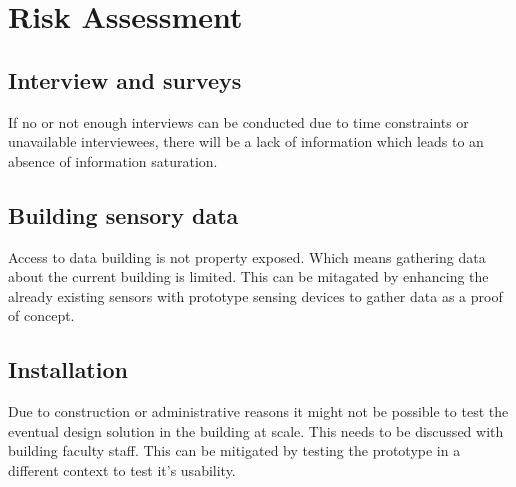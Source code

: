 \section{Risk Assessment}

\subsection{Interview and surveys}

If no or not enough interviews can be conducted due to time constraints or unavailable interviewees, there will be a lack of information which leads to an absence of information saturation. 

\subsection{Building sensory data}

Access to data building is not property exposed. Which means gathering data about the current building is limited. This can be mitagated by enhancing the already existing sensors with prototype sensing devices to gather data as a proof of concept.

\subsection{Installation}

Due to construction or administrative reasons it might not be possible to test the eventual design solution in the building at scale. This needs to be discussed with building faculty staff. This can be mitigated by testing the prototype in a different context to test it's usability.